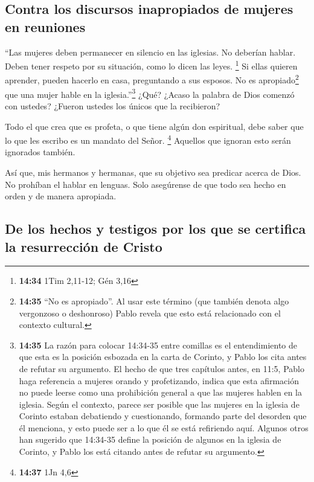 \hypertarget{contra-los-discursos-inapropiados-de-mujeres-en-reuniones}{%
\subsection{Contra los discursos inapropiados de mujeres en
reuniones}\label{contra-los-discursos-inapropiados-de-mujeres-en-reuniones}}

 ``Las mujeres deben permanecer en silencio en las
iglesias. No deberían hablar. Deben tener respeto por su situación, como
lo dicen las leyes. \footnote{\textbf{14:34} 1Tim 2,11-12; Gén 3,16}
 Si ellas quieren aprender, pueden hacerlo en casa,
preguntando a sus esposos. No es apropiado\footnote{\textbf{14:35} ``No
  es apropiado''. Al usar este término (que también denota algo
  vergonzoso o deshonroso) Pablo revela que esto está relacionado con el
  contexto cultural.} que una mujer hable en la iglesia.''\footnote{\textbf{14:35}
  La razón para colocar 14:34-35 entre comillas es el entendimiento de
  que esta es la posición esbozada en la carta de Corinto, y Pablo los
  cita antes de refutar su argumento. El hecho de que tres capítulos
  antes, en 11:5, Pablo haga referencia a mujeres orando y profetizando,
  indica que esta afirmación no puede leerse como una prohibición
  general a que las mujeres hablen en la iglesia. Según el contexto,
  parece ser posible que las mujeres en la iglesia de Corinto estaban
  debatiendo y cuestionando, formando parte del desorden que él
  menciona, y esto puede ser a lo que él se está refiriendo aquí.
  Algunos otros han sugerido que 14:34-35 define la posición de algunos
  en la iglesia de Corinto, y Pablo los está citando antes de refutar su
  argumento.}  ¿Qué? ¿Acaso la palabra de Dios comenzó
con ustedes? ¿Fueron ustedes los únicos que la recibieron?

 Todo el que crea que es profeta, o que tiene algún don
espiritual, debe saber que lo que les escribo es un mandato del Señor.
\footnote{\textbf{14:37} 1Jn 4,6}  Aquellos que ignoran
esto serán ignorados también.

 Así que, mis hermanos y hermanas, que su objetivo sea
predicar acerca de Dios. No prohíban el hablar en lenguas.
 Solo asegúrense de que todo sea hecho en orden y de
manera apropiada.

\hypertarget{de-los-hechos-y-testigos-por-los-que-se-certifica-la-resurrecciuxf3n-de-cristo}{%
\subsection{De los hechos y testigos por los que se certifica la
resurrección de
Cristo}\label{de-los-hechos-y-testigos-por-los-que-se-certifica-la-resurrecciuxf3n-de-cristo}}

